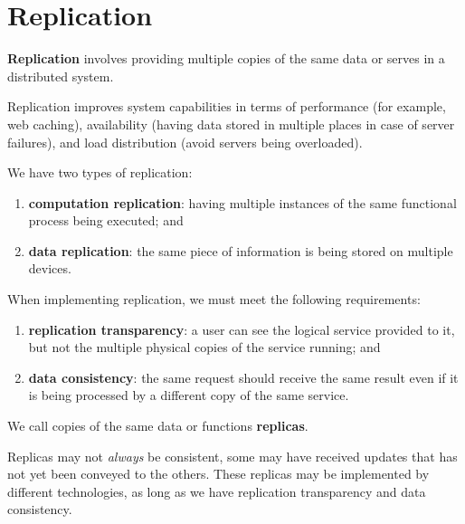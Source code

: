 \chapter{Replication}

\begin{definition}[Replication]
    \textbf{Replication} involves providing multiple copies of the same data
    or serves in a distributed system.
\end{definition}

Replication improves system capabilities in terms of performance
(for example, web caching),
availability
(having data stored in multiple places in case of server failures),
and load distribution
(avoid servers being overloaded).

We have two types of replication:
\begin{enumerate}
    \item \textbf{computation replication}: having multiple
        instances of the same functional process being executed; and
    \item \textbf{data replication}: the same piece of information is
        being stored on multiple devices.
\end{enumerate}

When implementing replication, we must meet the following requirements:
\begin{enumerate}
    \item \textbf{replication transparency}: a user can see the logical service
        provided to it, but not the multiple physical copies of the
        service running; and
    \item \textbf{data consistency}: the same request should receive the same
        result even if it is being processed by a different copy of the same
        service.
\end{enumerate}

\begin{definition}[Replicas]
    We call copies of the same data or functions \textbf{replicas}.
\end{definition}

Replicas may not \emph{always} be consistent,
some may have received updates that has not yet been conveyed to the others.
These replicas may be implemented by different technologies, 
as long as we have replication transparency and data consistency.

